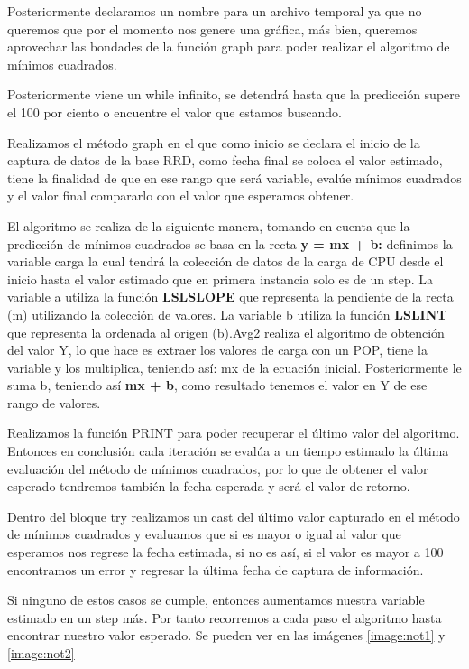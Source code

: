 \begin{itemize}
Posteriormente declaramos un nombre para un archivo temporal ya que no queremos que por el momento nos genere una gráfica, más bien, queremos aprovechar las bondades de la función graph para poder realizar el algoritmo de mínimos cuadrados.

Posteriormente viene un while infinito, se detendrá hasta que la predicción supere el 100 por ciento o encuentre el valor que estamos buscando.

Realizamos el método graph en el que como inicio se declara el inicio de la captura de datos de la base RRD, como fecha final se coloca el valor estimado, tiene la finalidad de que en ese rango que será variable, evalúe mínimos cuadrados y el valor final compararlo con el valor que esperamos obtener.

El algoritmo se realiza de la siguiente manera, tomando en cuenta que la predicción de mínimos cuadrados se basa en la recta \textbf{y = mx + b:}
definimos la variable carga la cual tendrá la colección de datos de la carga de CPU desde el inicio hasta el valor estimado que en primera instancia solo es de un step.
La variable a utiliza la función \textbf{LSLSLOPE} que representa la pendiente de la recta (m) utilizando la colección de valores.
La variable b utiliza la función \textbf{LSLINT} que representa la ordenada al origen (b).Avg2 realiza el algoritmo de obtención del valor Y, lo que hace es extraer los valores de carga con un POP, tiene la variable y los multiplica, teniendo así: mx de la ecuación inicial.
Posteriormente le suma b, teniendo así \textbf{mx + b}, como resultado tenemos el valor en Y de ese rango de valores.

Realizamos la función PRINT para poder recuperar el último valor del algoritmo. Entonces en conclusión cada iteración se evalúa a un tiempo estimado la última evaluación del método de mínimos cuadrados, por lo que de obtener el valor esperado tendremos también la fecha esperada y será el valor de retorno.

Dentro del bloque try realizamos un cast del último valor capturado en el método de mínimos cuadrados y evaluamos que si es mayor o igual al valor que esperamos nos regrese la fecha estimada, si no es así, si el valor es mayor a 100 encontramos un error y regresar la última fecha de captura de información.

Si ninguno de estos casos se cumple, entonces aumentamos nuestra variable estimado en un step más. Por tanto recorremos a cada paso el algoritmo hasta encontrar nuestro valor esperado.
Se pueden ver en las imágenes \ref{image:not1} y \ref{image:not2} 


\end{itemize}
